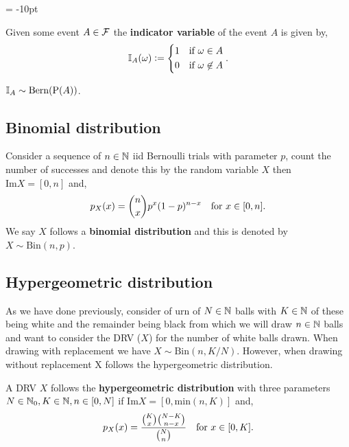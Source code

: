 \begingroup\belowdisplayskip = -10pt
\begin{definition}
    Given some event $A\in\mathcal{F}$ the \textbf{indicator variable} of the event $A$ is given by,\[
    \mathbb{I}_A(\omega) := \begin{dcases}
        1 & \text{\textcolor{black}{if }} \omega \in A \\
        0 & \text{\textcolor{black}{if }} \omega \not\in A
    \end{dcases}
    \textcolor{black}{.}
    \]
\end{definition}
\endgroup

\begin{remark}
    $\mathbb{I}_A \sim \text{Bern}(\mathrm{P}(A))$.
\end{remark}

\subsection{Binomial distribution}
\begin{definition}
    Consider a sequence of $n\in\mathbb{N}$ iid Bernoulli trials with parameter $p$, count the number of successes and denote this by the random variable $X$ then $\text{Im}X = [0,n]$ and, \[p_X(x) = \binom{n}{x}p^x(1-p)^{n-x} \quad \text{\textcolor{black}{for }$x\in[0,n]$}\textcolor{black}{.}\]
We say $X$ follows a \textbf{binomial distribution} and this is denoted by $X \sim \text{Bin}(n,p)$.
\end{definition}

\subsection{Hypergeometric distribution}
As we have done previously, consider of urn of $N\in\mathbb{N}$ balls with $K\in\mathbb{N}$ of these being white and the remainder being black from which we will draw $n\in\mathbb{N}$ balls and want to consider the DRV ($X$) for the number of white balls drawn. When drawing with replacement we have $X \sim \text{Bin}(n,K/N)$. However, when drawing without replacement X follows the hypergeometric distribution.

\begingroup\belowdisplayskip=0pt
\begin{definition}
    A DRV $X$ follows the \textbf{hypergeometric distribution} with three parameters $N\in\mathbb{N}_0, K\in\mathbb{N},n\in[0,N]$ if $\text{Im}X = [0,\text{min}(n,K)]$ and, \[
        p_X(x) = \frac{\binom{K}{x}\binom{N-K}{n-x}}{\binom{N}{n}} \quad \text{\textcolor{black}{for }$x\in[0,K]$}\textcolor{black}{.}
    \]
\end{definition}
\endgroup

